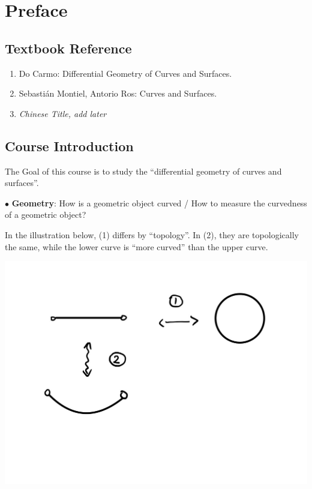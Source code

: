 \chapter*{\centering Preface}

\section*{Textbook Reference}
\begin{enumerate}[(1)]
    \item Do Carmo: Differential Geometry of Curves and Surfaces.
    \item Sebasti\'an Montiel, Antorio Ros: Curves and Surfaces.
    \item \textit{Chinese Title, add later}
\end{enumerate}
\section*{Course Introduction}
The Goal of this course is to study the ``differential geometry of curves and surfaces''.

\noindent
$\bullet$ \textbf{Geometry}: How is a geometric object curved / How to measure the curvedness of a geometric object? 
\begin{exam}
     In the illustration below, (1) differs by ``topology''. In (2), they are topologically the same, while the lower curve is ``more curved'' than the upper curve.
\end{exam}

\begin{center}
    \includegraphics[scale=0.3]{picture/preface_example1.jpg}
\end{center}

